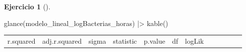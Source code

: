 \documentclass[
  a4paper,
]{scrreport}
\newenvironment{Shaded}{\begin{snugshade}}{\end{snugshade}}
\newcommand{\FunctionTok}[1]{\textcolor[rgb]{0.28,0.35,0.67}{#1}}
\newcommand{\NormalTok}[1]{\textcolor[rgb]{0.00,0.23,0.31}{#1}}
\newcommand{\SpecialCharTok}[1]{\textcolor[rgb]{0.37,0.37,0.37}{#1}}
\theoremstyle{definition}
\newtheorem{exercise}{Ejercicio}[chapter]
\theoremstyle{remark}
\begin{document}
\begin{exercise}[]
\begin{enumerate}
\begin{tcolorbox}
\begin{Shaded}
\begin{Highlighting}[]
\FunctionTok{glance}\NormalTok{(modelo\_lineal\_logBacterias\_horas) }\SpecialCharTok{|\textgreater{}} \FunctionTok{kable}\NormalTok{()}
\end{Highlighting}
\end{Shaded}

  \begin{longtable}[]{@{}
    >{\raggedleft\arraybackslash}p{}
    >{\raggedleft\arraybackslash}p{}
    >{\raggedleft\arraybackslash}p{}
    >{\raggedleft\arraybackslash}p{}
    >{\raggedleft\arraybackslash}p{}
    >{\raggedleft\arraybackslash}p{}
    >{\raggedleft\arraybackslash}p{}
    >{\raggedleft\arraybackslash}p{}
    >{\raggedleft\arraybackslash}p{}
    >{\raggedleft\arraybackslash}p{}
    >{\raggedleft\arraybackslash}p{}
    >{\raggedleft\arraybackslash}p{}@{}}
  \toprule\noalign{}
  \begin{minipage}[b]{\linewidth}\raggedleft
  r.squared
  \end{minipage} & \begin{minipage}[b]{\linewidth}\raggedleft
  adj.r.squared
  \end{minipage} & \begin{minipage}[b]{\linewidth}\raggedleft
  sigma
  \end{minipage} & \begin{minipage}[b]{\linewidth}\raggedleft
  statistic
  \end{minipage} & \begin{minipage}[b]{\linewidth}\raggedleft
  p.value
  \end{minipage} & \begin{minipage}[b]{\linewidth}\raggedleft
  df
  \end{minipage} & \begin{minipage}[b]{\linewidth}\raggedleft
  logLik
  \end{minipage} & \begin{minipage}[b]{\linewidth}\raggedleft

\end{minipage}
\end{longtable}
\end{tcolorbox}
\end{enumerate}
\end{exercise}
\end{document}
